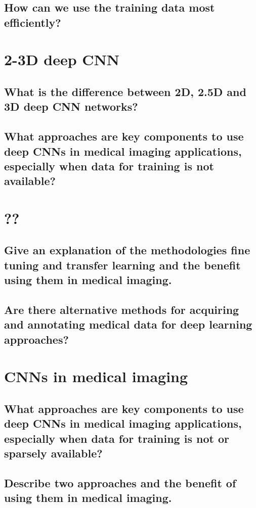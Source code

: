 \subsection{How can we use the training data most efficiently?}

\section{2-3D deep CNN}

\subsection{What is the difference between 2D, 2.5D and 3D deep CNN networks?}

\subsection{What approaches are key components to use deep CNNs in medical imaging applications, especially when data for training is not available?}

\section{??}

\subsection{Give an explanation of the methodologies fine tuning and transfer learning and the benefit using them in medical imaging. }

\subsection{Are there alternative methods for acquiring and annotating medical data for deep learning approaches?}

\section{CNNs in medical imaging}

\subsection{What approaches are key components to use deep CNNs in medical imaging applications, especially when data for training is not or sparsely available?}

\subsection{Describe two approaches and the benefit of using them in medical imaging.}

